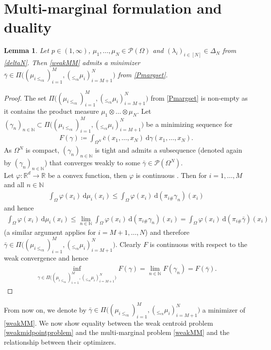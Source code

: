 \documentclass[10pt,a4paper]{amsart}
\newcommand{\RR}{\mathbb{R}}
\newcommand{\NN}{\mathbb{N}}
\newcommand{\dd}{\mathrm{d}}
\newtheorem{lma}[thm]{Lemma}
\begin{document}
\section{Multi-marginal formulation and duality}
\begin{lma}
	Let $p\in(1,\infty)$, $\mu_1,\dots,\mu_N\in\mathcal P(\Omega)$ and $(\lambda_i)_{i\in[N]}\in\Delta_N$ from \eqref{deltaN}. Then
	\eqref{weakMM} admits a minimizer $\bar\gamma\in \Pi\big((\mu_{i\leq_{\text{cx}}})_{i=1}^M,(_{\leq_{\text{cx}}}\mu_i)_{i=M+1}^N\big)$ from \eqref{Pmargset}.
\end{lma}
\begin{proof}
	The set $\Pi\big((\mu_{i\leq_{\text{cx}}})_{i=1}^M,(_{\leq_{\text{cx}}}\mu_i)_{i=M+1}^N\big)$ from \eqref{Pmargset} is non-empty as it contains the product measure $\mu_1\otimes\dots\otimes\mu_N$. Let $(\gamma_n)_{n\in\NN}\subset\Pi\big((\mu_{i\leq_{\text{cx}}})_{i=1}^M,(_{\leq_{\text{cx}}}\mu_i)_{i=M+1}^N\big)$ be a minimizing sequence for 
	\begin{gather*}
		F(\gamma)\coloneqq\int_{\Omega^N}\bar c(x_1,\dots,x_N)\ \dd\gamma(x_1,\dots,x_N).
	\end{gather*}
	As $\Omega^N$ is compact, $(\gamma_n)_{n\in\NN}$ is tight and admits a subsequence (denoted again by $(\gamma_n)_{n\in\NN}$) that converges weakly to some $\bar\gamma\in\mathcal P(\Omega^N)$.\\
	Let $\varphi:\RR^d\rightarrow\RR$ be a convex function, then $\varphi$ is continuous \cite[Cor 10.1.1]{rockafellar1997}. Then for $i=1,\dots,M$ and all $n\in\NN$
	\begin{gather*}
		\int_\Omega\varphi(x_i)\ \dd\mu_i(x_i)\leq\int_\Omega\varphi(x_i)\ \dd(\pi_{i\#}\gamma_n)(x_i)
	\end{gather*}
	and hence
	\begin{gather*}
		\int_\Omega\varphi(x_i)\ \dd\mu_i(x_i)\leq\lim_{n\in\NN}\int_\Omega\varphi(x_i)\ \dd(\pi_{i\#}\gamma_n)(x_i)=\int_\Omega\varphi(x_i)\ \dd(\pi_{i\#}\bar\gamma)(x_i)
	\end{gather*}
	(a similar argument applies for $i=M+1,\dots,N$) and therefore\\ $\bar\gamma\in\Pi\big((\mu_{i\leq_{\text{cx}}})_{i=1}^M,(_{\leq_{\text{cx}}}\mu_i)_{i=M+1}^N\big)$.
	Clearly $F$ is continuous with respect to the weak convergence and hence
	\begin{gather*}
		\inf_{\gamma\in\Pi\big((\mu_{i\leq_{\text{cx}}})_{i=1}^M,(_{\leq_{\text{cx}}}\mu_i)_{i=M+1}^N\big)}F(\gamma)=\lim_{n\in\NN}F(\gamma_n)=F(\bar\gamma).
	\end{gather*}
\end{proof}
From now on, we denote by $\bar\gamma\in\Pi\big((\mu_{i\leq_{\text{cx}}})_{i=1}^M,(_{\leq_{\text{cx}}}\mu_i)_{i=M+1}^N\big)$ a minimizer of \eqref{weakMM}.
We now show equality between the weak centroid problem \eqref{weakmidpointproblem} and the multi-marginal problem \eqref{weakMM} and the relationship between their optimizers.
\end{document}
